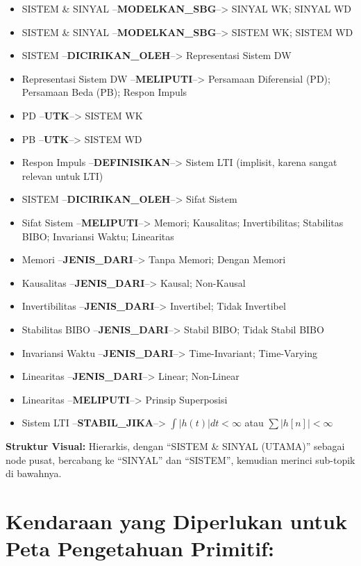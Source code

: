 \documentclass[
  letterpaper,
  DIV=11,
  numbers=noendperiod]{scrreprt}
\providecommand{\tightlist}{%
  \setlength{\itemsep}{0pt}\setlength{\parskip}{0pt}}
\begin{document}
\begin{itemize}
\tightlist
\item
  SISTEM \& SINYAL --\textbf{MODELKAN\_SBG}--\textgreater{} SINYAL WK;
  SINYAL WD
\item
  SISTEM \& SINYAL --\textbf{MODELKAN\_SBG}--\textgreater{} SISTEM WK;
  SISTEM WD
\item
  SISTEM --\textbf{DICIRIKAN\_OLEH}--\textgreater{} Representasi Sistem
  DW
\item
  Representasi Sistem DW --\textbf{MELIPUTI}--\textgreater{} Persamaan
  Diferensial (PD); Persamaan Beda (PB); Respon Impuls
\item
  PD --\textbf{UTK}--\textgreater{} SISTEM WK
\item
  PB --\textbf{UTK}--\textgreater{} SISTEM WD
\item
  Respon Impuls --\textbf{DEFINISIKAN}--\textgreater{} Sistem LTI
  (implisit, karena sangat relevan untuk LTI)
\item
  SISTEM --\textbf{DICIRIKAN\_OLEH}--\textgreater{} Sifat Sistem
\item
  Sifat Sistem --\textbf{MELIPUTI}--\textgreater{} Memori; Kausalitas;
  Invertibilitas; Stabilitas BIBO; Invariansi Waktu; Linearitas
\item
  Memori --\textbf{JENIS\_DARI}--\textgreater{} Tanpa Memori; Dengan
  Memori
\item
  Kausalitas --\textbf{JENIS\_DARI}--\textgreater{} Kausal; Non-Kausal
\item
  Invertibilitas --\textbf{JENIS\_DARI}--\textgreater{} Invertibel;
  Tidak Invertibel
\item
  Stabilitas BIBO --\textbf{JENIS\_DARI}--\textgreater{} Stabil BIBO;
  Tidak Stabil BIBO
\item
  Invariansi Waktu --\textbf{JENIS\_DARI}--\textgreater{}
  Time-Invariant; Time-Varying
\item
  Linearitas --\textbf{JENIS\_DARI}--\textgreater{} Linear; Non-Linear
\item
  Linearitas --\textbf{MELIPUTI}--\textgreater{} Prinsip Superposisi
\item
  Sistem LTI --\textbf{STABIL\_JIKA}--\textgreater{}
  \(\int |h(t)| dt < \infty\) atau \(\sum |h[n]| < \infty\)
\end{itemize}

\textbf{Struktur Visual:} Hierarkis, dengan ``SISTEM \& SINYAL (UTAMA)''
sebagai node pusat, bercabang ke ``SINYAL'' dan ``SISTEM'', kemudian
merinci sub-topik di bawahnya.

\section{Kendaraan yang Diperlukan untuk Peta Pengetahuan
Primitif:}\label{kendaraan-yang-diperlukan-untuk-peta-pengetahuan-primitif}
\end{document}
